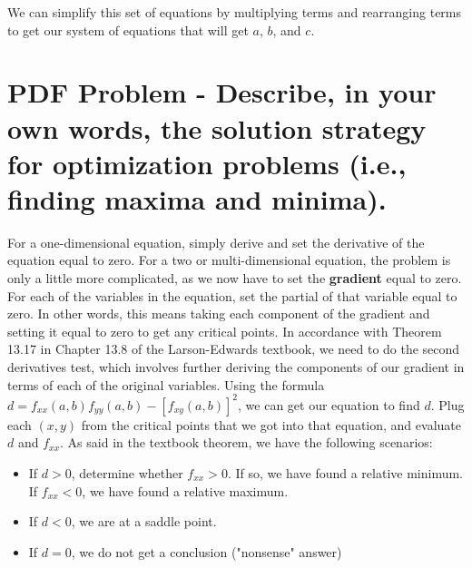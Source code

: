 \documentclass{article}
\begin{document}
\par\noindent\large We can simplify this set of equations by multiplying terms and rearranging terms to get our system of equations that will get $a$, $b$, and $c$.

\section{PDF Problem - Describe, in your own words, the solution strategy for optimization problems (i.e., finding maxima and minima).}

\par\noindent\large For a one-dimensional equation, simply derive and set the derivative of the equation equal to zero.  For a two or multi-dimensional equation, the problem is only a little more complicated, as we now have to set the \textbf{gradient} equal to zero.  For each of the variables in the equation, set the partial of that variable equal to zero.  In other words, this means taking each component of the gradient and setting it equal to zero to get any critical points.  In accordance with Theorem 13.17 in Chapter 13.8 of the Larson-Edwards textbook, we need to do the second derivatives test, which involves further deriving the components of our gradient in terms of each of the original variables.  Using the formula $d = f_{xx}(a, b)f_{yy}(a, b) - [f_{xy}(a, b)]^{2}$, we can get our equation to find $d$.  Plug each $(x, y)$ from the critical points that we got into that equation, and evaluate $d$ and $f_{xx}$.  As said in the textbook theorem, we have the following scenarios:

\begin{itemize}
  \item If $d > 0$, determine whether $f_{xx} > 0$.  If so, we have found a relative minimum.  If $f_{xx} < 0$, we have found a relative maximum.
  \item If $d < 0$, we are at a saddle point.
  \item If $d = 0$, we do not get a conclusion ("nonsense" answer)
\end{itemize}
\end{document}
